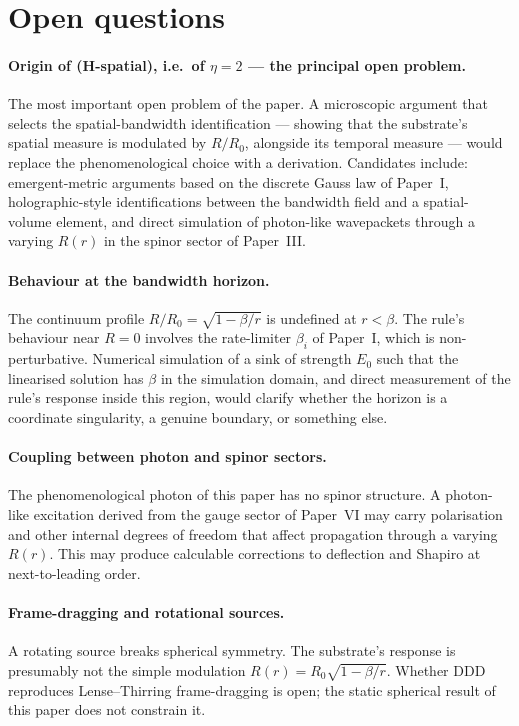 \documentclass[11pt,a4paper]{article}
\begin{document}
\section{Open questions}
\label{sec:open}

\paragraph{Origin of (H-spatial), i.e.\ of $\eta = 2$ ---
the principal open problem.}
The most important open problem of the paper. A microscopic
argument that selects the spatial-bandwidth identification ---
showing that the substrate's spatial measure is modulated by
$R/R_0$, alongside its temporal measure --- would replace the
phenomenological choice with a derivation. Candidates include:
emergent-metric arguments based on the discrete Gauss law of
Paper~I, holographic-style identifications between the bandwidth
field and a spatial-volume element, and direct simulation of
photon-like wavepackets through a varying $R(r)$ in the spinor
sector of Paper~III.

\paragraph{Behaviour at the bandwidth horizon.}
The continuum profile $R/R_0 = \sqrt{1 - \beta/r}$ is undefined
at $r < \beta$. The rule's behaviour near $R = 0$ involves the
rate-limiter $\beta_i$ of Paper~I, which is non-perturbative.
Numerical simulation of a sink of strength $E_0$ such that the
linearised solution has $\beta$ in the simulation domain, and
direct measurement of the rule's response inside this region,
would clarify whether the horizon is a coordinate singularity, a
genuine boundary, or something else.

\paragraph{Coupling between photon and spinor sectors.}
The phenomenological photon of this paper has no spinor
structure. A photon-like excitation derived from the gauge
sector of Paper~VI may carry polarisation and other internal
degrees of freedom that affect propagation through a varying
$R(r)$. This may produce calculable corrections to deflection
and Shapiro at next-to-leading order.

\paragraph{Frame-dragging and rotational sources.}
A rotating source breaks spherical symmetry. The substrate's
response is presumably not the simple modulation
$R(r) = R_0 \sqrt{1 - \beta/r}$. Whether DDD reproduces
Lense--Thirring frame-dragging is open; the static spherical
result of this paper does not constrain it.
\end{document}
